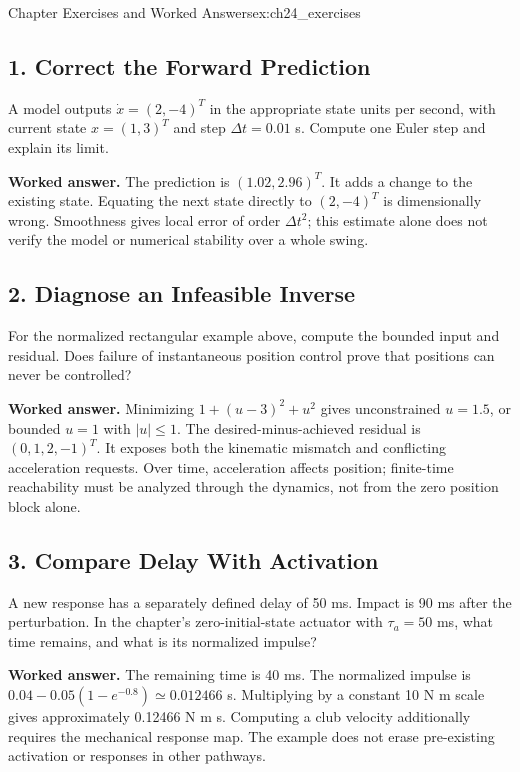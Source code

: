 \begin{exercises}{Chapter Exercises and Worked Answers}{ex:ch24_exercises}
\subsection*{1. Correct the Forward Prediction}
A model outputs $\dot x=(2,-4)^T$ in the appropriate state units per second, with current state $x=(1,3)^T$ and step $\Delta t=0.01$ s. Compute one Euler step and explain its limit.

\textbf{Worked answer.} The prediction is $(1.02,2.96)^T$. It adds a change to the existing state. Equating the next state directly to $(2,-4)^T$ is dimensionally wrong. Smoothness gives local error of order $\Delta t^2$; this estimate alone does not verify the model or numerical stability over a whole swing.

\subsection*{2. Diagnose an Infeasible Inverse}
For the normalized rectangular example above, compute the bounded input and residual. Does failure of instantaneous position control prove that positions can never be controlled?

\textbf{Worked answer.} Minimizing $1+(u-3)^2+u^2$ gives unconstrained $u=1.5$, or bounded $u=1$ with $|u|\leq1$. The desired-minus-achieved residual is $(0,1,2,-1)^T$. It exposes both the kinematic mismatch and conflicting acceleration requests. Over time, acceleration affects position; finite-time reachability must be analyzed through the dynamics, not from the zero position block alone.

\subsection*{3. Compare Delay With Activation}
A new response has a separately defined delay of 50 ms. Impact is 90 ms after the perturbation. In the chapter's zero-initial-state actuator with $\tau_a=50$ ms, what time remains, and what is its normalized impulse?

\textbf{Worked answer.} The remaining time is 40 ms. The normalized impulse is $0.04-0.05(1-e^{-0.8})\simeq0.012466$ s. Multiplying by a constant 10 N m scale gives approximately 0.12466 N m s. Computing a club velocity additionally requires the mechanical response map. The example does not erase pre-existing activation or responses in other pathways.


\end{exercises}
